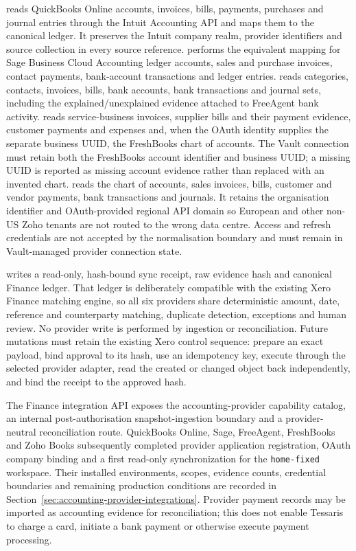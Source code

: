  reads QuickBooks Online accounts,
invoices, bills, payments, purchases and journal entries through the Intuit
Accounting API and maps them to the canonical ledger.  It preserves the Intuit
company realm, provider identifiers and source collection in every source
reference.   performs the equivalent mapping
for Sage Business Cloud Accounting ledger accounts, sales and purchase
invoices, contact payments, bank-account transactions and ledger entries.
 reads categories, contacts, invoices,
bills, bank accounts, bank transactions and journal sets, including the
explained/unexplained evidence attached to FreeAgent bank activity.
 reads service-business invoices,
supplier bills and their payment evidence, customer payments and expenses and,
when the OAuth identity supplies the separate
business UUID, the FreshBooks chart of accounts.  The Vault connection must
retain both the FreshBooks account identifier and business UUID; a missing UUID
is reported as missing account evidence rather than replaced with an invented
chart.   reads the chart of accounts,
sales invoices, bills, customer and vendor payments, bank transactions and
journals.  It retains the organisation identifier and OAuth-provided regional
API domain so European and other non-US Zoho tenants are not routed to the
wrong data centre.
Access and refresh credentials are not accepted by the normalisation boundary
and must remain in Vault-managed provider connection state.

 writes a read-only, hash-bound sync receipt,
raw evidence hash and canonical Finance ledger.  That ledger is deliberately
compatible with the existing Xero Finance matching engine, so all six
providers share deterministic amount, date, reference and counterparty
matching, duplicate detection, exceptions and human review.  No provider write
is performed by ingestion or reconciliation.  Future mutations must retain the
existing Xero control sequence: prepare an exact payload, bind approval to its
hash, use an idempotency key, execute through the selected provider adapter,
read the created or changed object back independently, and bind the receipt to
the approved hash.

The Finance integration API exposes the accounting-provider capability catalog,
an internal post-authorisation snapshot-ingestion boundary and a provider-neutral
reconciliation route.  QuickBooks Online, Sage, FreeAgent, FreshBooks and Zoho
Books subsequently completed provider application registration, OAuth company
binding and a first read-only synchronization for the \texttt{home-fixed}
workspace.  Their installed environments, scopes, evidence counts, credential
boundaries and remaining production conditions are recorded in
Section~\ref{sec:accounting-provider-integrations}.  Provider payment records
may be imported as accounting evidence for reconciliation; this does not enable
Tessaris to charge a card, initiate a bank payment or otherwise execute payment
processing.

